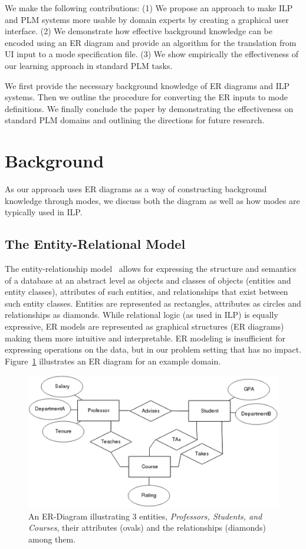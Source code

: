 \documentclass[sigconf]{acmart}
\begin{document}
We make the following contributions: (1) We propose an approach to make ILP and PLM systems more usable by domain experts by creating a graphical user interface. (2) We demonstrate how effective background knowledge can be encoded using an ER diagram and provide an algorithm for the  translation from UI input to a mode specification file. (3) We show empirically the effectiveness of our learning approach in standard PLM tasks.

We first provide the necessary background knowledge of ER diagrams and ILP systems. Then we outline the procedure for converting the ER inputs to mode definitions. We finally conclude the paper by demonstrating the effectiveness on standard PLM domains and outlining the directions for future research.
\section{Background}

As our approach uses ER diagrams as a way of constructing background knowledge through modes, we discuss both the diagram as well as how modes are typically used in ILP.

\subsection{The Entity-Relational Model}

The entity-relationship model~\cite{chen1976entity} allows for expressing the structure and semantics of a database at an abstract level as objects and classes of objects (entities and entity classes), attributes of such entities, and relationships that exist between such entity classes. Entities are represented as rectangles, attributes as circles and relationships as diamonds. While relational logic (as used in ILP) is equally expressive, ER models are represented as graphical structures (ER diagrams) making them more intuitive and interpretable. ER modeling is insufficient for expressing operations on the data, but in our problem setting that has no impact. Figure~\ref{fig:egERD} illustrates an ER diagram for an example domain.

\begin{figure}
    \centering
    \includegraphics[width=\columnwidth]{images/baseERD.png}
    \caption{An ER-Diagram illustrating 3 entities, \textit{Professors, Students, and Courses}, their attributes (ovals)  and the relationships (diamonds) among them.}
    \label{fig:egERD}
\end{figure}
\end{document}
